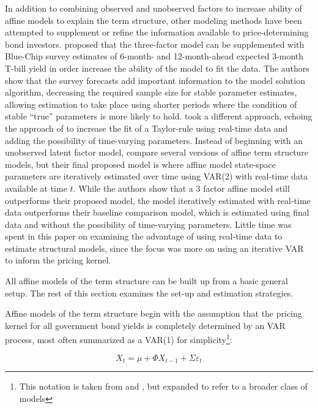 \documentclass{article}
\numberwithin{equation}{section}
\begin{document}
In addition to combining observed and unobserved factors to increase ability of
affine models to explain the term structure, other modeling methods have been
attempted to supplement or refine the information available to
price-determining bond investors. \citet{kimorphanides2005} proposed that the
three-factor model can be supplemented with Blue-Chip survey estimates of
6-month- and 12-month-ahead expected 3-month T-bill yield in order increase the
ability of the model to fit the data. The authors show that the survey
forecasts add important information to the model solution algorithm, decreasing
the required sample size for stable parameter estimates, allowing estimation to
take place using shorter periods where the condition of stable ``true''
parameters is more likely to hold. \citet{orphanideswei2010} took a different
approach, echoing the approach of \cite{orphanides2001monetary} to increase the
fit of a Taylor-rule using real-time data and adding the possibility of
time-varying parameters. Instead of beginning with an unobserved latent factor
model, \citeauthor{orphanideswei2010} compare several versions of affine term
structure models, but their final proposed model is where affine model
state-space parameters are iteratively estimated over time using VAR(2) with
real-time data available at time $t$. While the authors show that a 3 factor
affine model still outperforms their proposed model, the model iteratively
estimated with real-time data outperforms their baseline comparison model,
which is estimated using final data and without the possibility of time-varying
parameters. Little time was spent in this paper on examining the advantage of
using real-time data to estimate structural models, since the focus was more on
using an iterative VAR to inform the pricing kernel.

All affine models of the term structure can be built up from a basic general
setup. The rest of this section examines the set-up and estimation strategies.

Affine models of the term structure begin with the assumption that the pricing
kernel for all government bond yields is completely determined by an VAR
process, most often summarized as a VAR(1) for simplicity\footnote{This
  notation is taken from \citet{sack2005monetary} and \cite{ang2003no}, but
expanded to refer to a broader class of models}:

\begin{equation}
    X_t = \mu + \Phi{X_{t-1}}+\Sigma\varepsilon_t
    \label{eq:aff1}
\end{equation}
\end{document}

